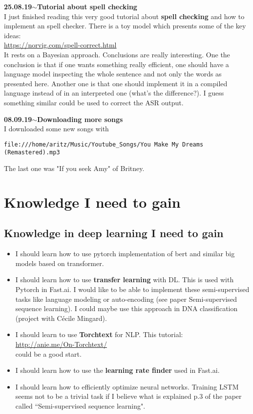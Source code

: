 \documentclass[11pt,a4paper]{article}
\newenvironment{loggentry}[2]%
{\noindent\textbf{#1}\hspace{1cm}$\mathbf{\sim}$\text{ }\textbf{#2}\\}{\vspace{0.5cm}}
\begin{document}
\begin{loggentry}{25.08.19}{Tutorial about spell checking}

I just finished reading this very good tutorial about \textbf{spell checking} and how to implement an spell checker.  There is a toy model which presents some of the key ideas:\\
\url{https://norvig.com/spell-correct.html}\\
It rests on a Bayesian approach. Conclusions are really interesting. One the conclusion is that if one wants something really efficient, one should have a language model inspecting the whole sentence and not only the words as presented here. Another one is that one should implement it in a compiled language instead of in an interpreted one (what's the difference?). I guess something similar could be used to correct the ASR output.

\end{loggentry}


\begin{loggentry}{08.09.19}{Downloading more songs}

I downloaded some new songs with
\begin{verbatim}
file:///home/aritz/Music/Youtube_Songs/You Make My Dreams (Remastered).mp3
\end{verbatim}

The last one was "If you seek Amy" of Britney.

\end{loggentry}


\section{Knowledge I need to gain}

\subsection{Knowledge in deep learning I need to gain}
\begin{itemize}
\item I should learn how to use pytorch implementation of bert and similar big models based on transformer.
\item I should learn how to use \textbf{transfer learning} with DL. This is used with Pytorch in Fast.ai. I would like to be able to implement these semi-supervised tasks like language modeling or auto-encoding (see paper Semi-supervised sequence learning). I could maybe use this approach in DNA classification (project with Cécile Mingard).
\item I should learn to use \textbf{Torchtext} for NLP. This tutorial:\\
\url{http://anie.me/On-Torchtext/}\\
could be a good start.
\item I should learn how to use the \textbf{learning rate finder} used in Fast.ai.
\item I should learn how to efficiently optimize neural networks. Training LSTM seems not to be a trivial task if I believe what is explained p.3 of the paper called ``Semi-supervised sequence learning".
\end{itemize}
\end{document}
